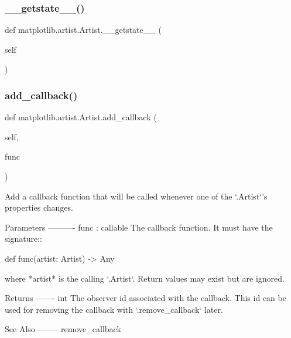 \subsubsection{\texorpdfstring{\+\_\+\+\_\+getstate\+\_\+\+\_\+()}{\_\_getstate\_\_()}}
{\footnotesize\ttfamily def matplotlib.\+artist.\+Artist.\+\_\+\+\_\+getstate\+\_\+\+\_\+ (\begin{DoxyParamCaption}\item[{}]{self }\end{DoxyParamCaption})}

\mbox{\label{classmatplotlib_1_1artist_1_1Artist_a816f7d16a84b68d1281320fce9c299ab}} 
\subsubsection{\texorpdfstring{add\+\_\+callback()}{add\_callback()}}
{\footnotesize\ttfamily def matplotlib.\+artist.\+Artist.\+add\+\_\+callback (\begin{DoxyParamCaption}\item[{}]{self,  }\item[{}]{func }\end{DoxyParamCaption})}

\begin{DoxyVerb}Add a callback function that will be called whenever one of the
`.Artist`'s properties changes.

Parameters
----------
func : callable
    The callback function. It must have the signature::

def func(artist: Artist) -> Any

    where *artist* is the calling `.Artist`. Return values may exist
    but are ignored.

Returns
-------
int
    The observer id associated with the callback. This id can be
    used for removing the callback with `.remove_callback` later.

See Also
--------
remove_callback
\end{DoxyVerb}
 \mbox{\label{classmatplotlib_1_1artist_1_1Artist_a5519c6dadebe26f2972017de81ef963b}} 
